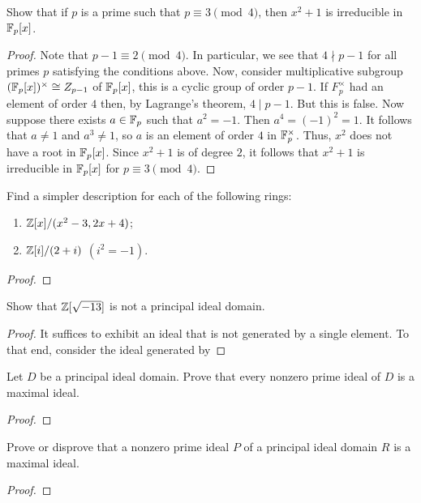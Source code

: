\begin{problem}
Show that if $p$ is a prime such that $p\equiv 3\pmod{4}$, then $x^2+1$ is
irreducible in $\mathbb{F}_p[x]$.
\end{problem}
\begin{proof}
Note that $p-1\equiv 2\pmod{4}$. In particular, we see that $4\nmid p-1$
for all primes $p$ satisfying the conditions above. Now, consider
multiplicative subgroup $(\mathbb{F}_p[x])^\times\cong Z_{p-1}$ of
$\mathbb{F}_p[x]$, this is a cyclic group of order $p-1$. If $F_p^\times$ had an
element of order $4$ then, by Lagrange's theorem, $4\mid p-1$. But this is
false. Now suppose there exists $a\in\mathbb{F}_p$ such that $a^2=-1$. Then
$a^4=(-1)^2=1$. It follows that $a\neq 1$ and $a^3\neq 1$, so $a$ is an
element of order $4$ in $\mathbb{F}_p^\times$. Thus, $x^2$ does not have a root
in $\mathbb{F}_p[x]$. Since $x^2+1$ is of degree $2$, it follows that $x^2+1$ is
irreducible in $\mathbb{F}_p[x]$ for $p\equiv 3\pmod{4}$.
\end{proof}

\begin{problem}
Find a simpler description for each of the following rings:
\begin{enumerate}
\item $\mathbb{Z}[x]/(x^2-3,2x+4)$;
\item $\mathbb{Z}[i]/(2+i)$ $(i^2=-1)$.
\end{enumerate}
\end{problem}
\begin{proof}
\end{proof}

\begin{problem}
Show that $\mathbb{Z}[\sqrt{-13}]$ is not a principal ideal domain.
\end{problem}
\begin{proof}
It suffices to exhibit an ideal that is not generated by a single
element. To that end, consider the ideal generated by
\end{proof}

\begin{problem}
Let $D$ be a principal ideal domain. Prove that every nonzero prime ideal
of $D$ is a maximal ideal.
\end{problem}
\begin{proof}
\end{proof}

\begin{problem}
Prove or disprove that a nonzero prime ideal $P$ of a principal ideal
domain $R$ is a maximal ideal.
\end{problem}
\begin{proof}
\end{proof}

